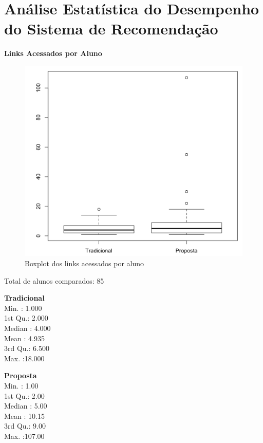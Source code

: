 \chapter{Análise Estatística do Desempenho do Sistema de Recomendação}\label{ape:analise-estatistica-do-uso}

\textbf{Links Acessados por Aluno}

\begin{figure}[htb]
  \caption{\label{fig:uso-sr-boxplot}Boxplot dos links acessados por aluno}
  \begin{center}
      \includegraphics[scale=0.4]{./Figuras/uso-sr-boxplot.png}
  \end{center}
\end{figure}

Total de alunos comparados: 85

\begin{multicols}{2}

\noindent\textbf{Tradicional}\\
Min.   : 1.000\\
1st Qu.: 2.000\\
Median : 4.000\\
Mean   : 4.935\\
3rd Qu.: 6.500\\
Max.   :18.000\\

\columnbreak

\noindent\textbf{Proposta}\\
 Min.   :  1.00\\
 1st Qu.:  2.00\\
 Median :  5.00\\
 Mean   : 10.15\\
 3rd Qu.:  9.00\\
 Max.   :107.00
\end{multicols}

